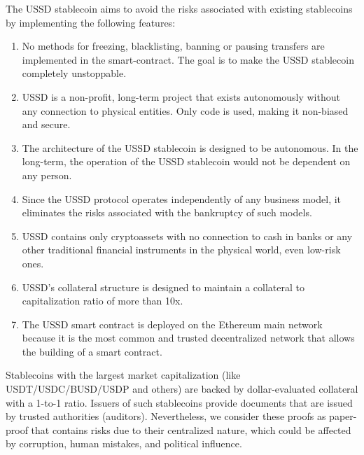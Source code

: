 The USSD stablecoin aims to avoid the risks associated with existing stablecoins 
by implementing the following features:
\begin{enumerate}
  \item No methods for freezing, blacklisting, banning or pausing transfers are 
  implemented in the smart-contract. The goal is to make the USSD stablecoin completely unstoppable.
  \item USSD is a non-profit, long-term project that exists autonomously without any 
  connection to physical entities. Only code is used, making it non-biased and secure.
  \item The architecture of the USSD stablecoin is designed to be autonomous. In the 
  long-term, the operation of the USSD stablecoin would not be dependent on any person.
  \item Since the USSD protocol operates independently of any business model, it 
  eliminates the risks associated with the bankruptcy of such models.
  \item USSD contains only cryptoassets with no connection to cash in banks or any 
  other traditional financial instruments in the physical world, even low-risk ones.
  \item USSD's collateral structure is designed to maintain a collateral to capitalization 
  ratio of more than 10x.
  \item The USSD smart contract is deployed on the Ethereum main network because it is 
  the most common and trusted decentralized network that allows the building of a smart contract.
\end{enumerate}

Stablecoins with the largest market capitalization (like USDT/USDC/BUSD/USDP and others) are 
backed by dollar-evaluated collateral with a 1-to-1 ratio. Issuers of such stablecoins 
provide documents that are issued by trusted authorities (auditors). Nevertheless, we consider 
these proofs as paper-proof that contains risks due to their centralized nature, which could 
be affected by corruption, human mistakes, and political influence.

